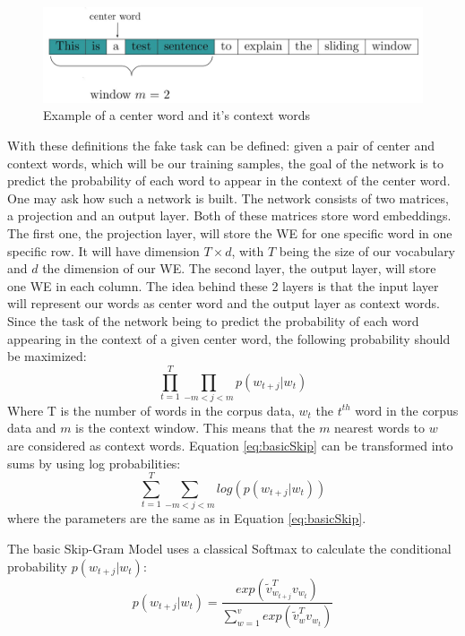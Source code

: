 \documentclass[conference]{IEEEtran}
\begin{document}
\begin{figure}[h]
\centering
\includegraphics[scale=0.3]{images/window_ex}
\caption{Example of a center word and it's context words}
\label{fig:window_ex}
\end{figure}
With these definitions the fake task can be defined: given a pair of center and context words, which will be our training samples, the goal of the network is to predict the probability of each word to appear in the context of the center word. One may ask how such a network is built. The network consists of two matrices, a projection and an output layer. Both of these matrices store word embeddings. The first one, the projection layer, will store the WE for one specific word in one specific row. It will have dimension $T\times d$, with $T$ being the size of our vocabulary and $d$ the dimension of our WE. The second layer, the output layer, will store one WE in each column. The idea behind these 2 layers is that the input layer will represent our words as center word and the output layer as context words. Since the task of the network being to predict the probability of each word appearing in the context of a given center word, the following probability should be maximized:\\
\begin{equation} \label{eq:basicSkip}
\prod_{t=1}^T \prod_{-m<j<m} p(w_{t+j}|w_t)
\end{equation}
Where T is the number of words in the corpus data, $w_t$ the $t^{th}$ word in the corpus data and $m$ is the context window. This means that the $m$ nearest words to $w$ are considered as context words.
Equation \ref{eq:basicSkip} can be transformed into sums by using log probabilities:
\begin{equation}
\sum _{t=1}^T \sum_{-m<j<m} log( p(w_{t+j}|w_t) )
\end{equation}
where the parameters are the same as in Equation \ref{eq:basicSkip}.

The basic Skip-Gram Model uses a classical Softmax to calculate the conditional probability $p(w_{t+j}|w_t)$:
\begin{equation} \label{eq:softmax}
p(w_{t+j}|w_t)= \frac{exp( \tilde{v}_{w_{t+j}}^Tv_{w_t})}{\sum_{w=1}^v exp(\tilde{v}_w^Tv_{ w_t})}
\end{equation}
\end{document}
